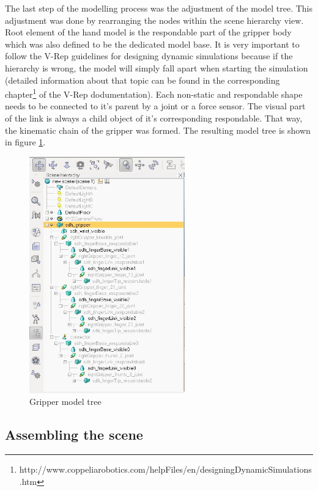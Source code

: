 The last step of the modelling process was the adjustment of the model tree. This adjustment was done by rearranging the nodes within the scene hierarchy view. Root element of the hand model is the respondable part of the gripper body which was also defined to be the dedicated model base. It is very important to follow the V-Rep guidelines for designing dynamic simulations because if the hierarchy is wrong, the model will simply fall apart when starting the simulation (detailed information about that topic can be found in the corresponding chapter\footnote{http://www.coppeliarobotics.com/helpFiles/en/designingDynamicSimulations.htm} of the V-Rep dodumentation). Each non-static and respondable shape needs to be connected to it's parent by a joint or a force sensor. The visual part of the link is always a child object of it's corresponding respondable. That way, the kinematic chain of the gripper was formed. The resulting model tree is shown in figure \ref{fig:gripper_tree}.
\begin{figure}[ht]
	\centering
  	\includegraphics[width=0.6\textwidth]{images/gripper_tree.jpg}
	\caption{Gripper model tree}
	\label{fig:gripper_tree}
\end{figure}

\subsection{Assembling the scene}

